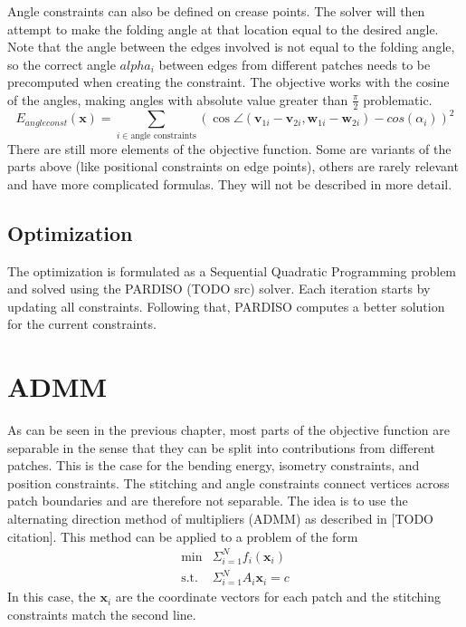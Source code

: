\documentclass[a4paper,twoside,12pt,nochapterprefix]{scrbook}
\begin{document}
Angle constraints can also be defined on crease points. The solver will then attempt to make the folding angle at that location equal to the desired angle. Note that the angle between the edges involved is not equal to the folding angle, so the correct angle $alpha_i$ between edges from different patches needs to be precomputed when creating the constraint. The objective works with the cosine of the angles, making angles with absolute value greater than $\frac{\pi}{2}$ problematic.
\begin{equation}
E_{angleconst}(\mathbf{x}) = \sum_{i \in \mbox{angle constraints}} (\cos \angle (\mathbf{v}_{1i} - \mathbf{v}_{2i}, \mathbf{w}_{1i} - \mathbf{w}_{2i}) - cos(\alpha_i))^2
\end{equation}
There are still more elements of the objective function. Some are variants of the parts above (like positional constraints on edge points), others are rarely relevant and have more complicated formulas. They will not be described in more detail.\newline
\section{Optimization}
The optimization is formulated as a Sequential Quadratic Programming problem and solved using the PARDISO (TODO src) solver. Each iteration starts by updating all constraints. Following that, PARDISO computes a better solution for the current constraints.
\chapter{ADMM}\label{sec:admm}
As can be seen in the previous chapter, most parts of the objective function are separable in the sense that they can be split into contributions from different patches. This is the case for the bending energy, isometry constraints, and position constraints. The stitching and angle constraints connect vertices across patch boundaries and are therefore not separable.\newline
The idea is to use the alternating direction method of multipliers (ADMM) as described in [TODO citation]. This method can be applied to a problem of the form
\begin{equation}
\begin{array}{lr}
\mbox{min} & \Sigma_{i=1}^{N} f_i(\mathbf{x}_i) \\
\mbox{s.t.} & \Sigma_{i=1}^{N} A_i \mathbf{x}_i = c
\end{array}
\end{equation}
In this case, the $\mathbf{x}_i$ are the coordinate vectors for each patch and the stitching constraints match the second line.\newline
\end{document}
